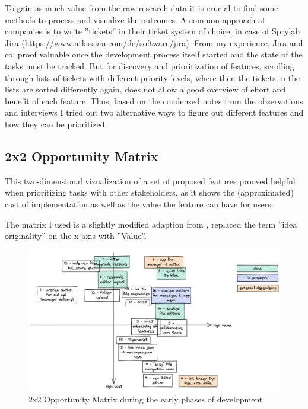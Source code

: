 To gain as much value from the raw research data it is crucial to find some methods to process and visualize the outcomes.
A common approach at companies is to write ''tickets'' in their ticket system of choice, in case of Sprylab Jira (\url{https://www.atlassian.com/de/software/jira}).
From my experience, Jira and co. proof valuable once the development process itself started and the state of the tasks must be tracked.
But for discovery and prioritization of features, scrolling through lists of tickets with different priority levels, where then the tickets in the lists are sorted differently again, does not allow a good overview of effort and benefit of each feature.
Thus, based on the condensed notes from the observations and interviews I tried out two alternative ways to figure out different features and how they can be prioritized.

\subsection{2x2 Opportunity Matrix}

This two-dimensional vizualization of a set of proposed features prooved helpful when prioritizing tasks with other stakeholders,
as it shows the (approximated) cost of implementation as well as the value the feature can have for users.

The matrix I used is a slightly modified adaption from \cite[p. 181]{LearnHCI:2020ys}, replaced the term ''idea originality'' on the x-axis with ''Value''.

\begin{figure}[h!]
	\centering
  \includegraphics[width=\textwidth]{pics/feature_cost_matrix.excalidraw.png}
	\caption{2x2 Opportunity Matrix during the early phases of development}
	\label{fig:opportunitymatrix}
\end{figure}


